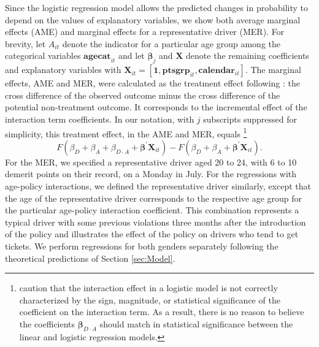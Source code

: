 \documentclass{cje}
\begin{document}
Since the logistic regression model allows the predicted changes in probability to depend on
the values of explanatory variables, 
we show both average marginal effects (AME)
and marginal effects for a representative driver (MER). 
% 
For brevity, let $A_{it}$ denote the indicator for a particular age group 
among the categorical variables $\bm{agecat}_{it}$
and let $\bm{\beta}_j$ and $\bm{X}$ denote 
the remaining coefficients and explanatory variables 
with $\bm{X}_{it} = [\bm{1}, \bm{ptsgrp}_{it}, \bm{calendar}_{it}]$. 
% 
The marginal effects, AME and MER, 
were calculated as the treatment effect following \citet{puhani2012}:
the cross difference of the observed outcome 
minus the cross difference of the potential non-treatment outcome. It corresponds to the incremental effect of the interaction term coefficients. 
In our notation, with $j$ subscripts suppressed for simplicity, 
this treatment effect, in the AME and MER, equals%
% 
\footnote{
\citet{ainorton2003} caution that 
the interaction effect in a logistic model 
is not correctly characterized by the
sign, magnitude, or statistical significance of the coefficient on the
interaction term.
%
As a result, there is no reason to believe the coefficients $\bm{\beta}_{D\cdot A}$
should match in statistical significance between the 
linear and logistic regression models. 
}
%
$$
	F(\beta_D + \beta_A + \beta_{D\cdot A} + \bm{\beta}^\prime \bm{X}_{it})
		- F(\beta_D + \beta_A + \bm{\beta}^\prime \bm{X}_{it}).
$$
% 
For the MER, 
we specified a representative driver aged 20 to 24, 
with 6 to 10 demerit points on their record, 
on a Monday in July.
For the regressions with age-policy interactions, 
we defined the representative driver similarly,
except that the age of the representative driver 
corresponds to the respective age group
for the particular age-policy interaction coefficient. 
This combination represents a typical driver with some previous violations 
three months after the introduction of the policy and illustrates 
the effect of the policy on drivers who tend to get tickets.  
% 
We perform regressions for both genders separately following the theoretical predictions of Section \ref{sec:Model}.
\end{document}
